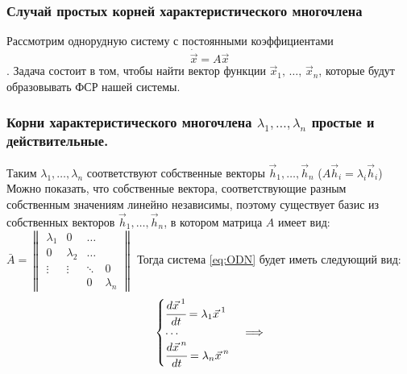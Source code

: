 \subsubsection*{Случай простых корней характеристического многочлена}
Рассмотрим однорудную систему с постоянными коэффициентами \begin{equation}
  \dot{\vec{x}} = A \vec{x} \label{eq:ODN}
\end{equation}. Задача состоит в том, чтобы найти вектор функции $\vec{x}_1, \, \dots, \, \vec{x}_n$, которые будут образовывать ФСР нашей системы. 

\subsubsection*{Корни характеристического многочлена $\lambda_1, \dots, \lambda_n$ простые и действительные.}

Таким $\lambda_1, \dots, \lambda_n$ соответствуют собственные векторы $\vec{h}_1, \dots, \vec{h}_n$ ($A \vec{h}_i = \lambda_i \vec{h}_i$)
Можно показать, что собственные вектора, соответствующие разным собственным значениям линейно независимы, 
поэтому существует базис из собственных векторов $\vec{h}_1, \dots, \vec{h}_n$, в котором матрица $A$ имеет вид: 
$\bar{A} = \begin{Vmatrix} \lambda_1 & 0 & \ldots & \\ 0 & \lambda_2 & \ldots \\  \vdots& \vdots & \ddots &  0 \\ & & 0 & \lambda_n \end{Vmatrix}$ 
Тогда система \eqref{eq:ODN} будет иметь следующий вид: 
\[ \begin{cases}
    \cfrac{d \vec{x\,}^1}{dt} = \lambda_1 \vec{x \,}^1 \\
    \cdots \\
    \cfrac{d \vec{x \,}^n}{dt} = \lambda_n \vec{x \,}^n
\end{cases} \Longrightarrow \]

